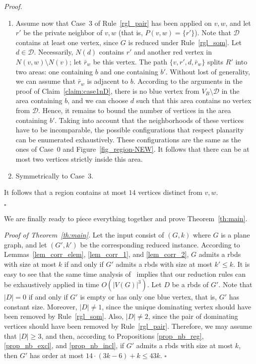\documentclass[a4paper,11pt]{article}
\newcommand{\rrgl}   [1] {Rule~\ref{#1}\xspace}
\newcommand{\drb}    [0] {rbds\xspace}
\newenvironment{proof}{\noindent \textit{Proof. }}{\hfill$\square$\vspace{.2cm}}
\newenvironment{proofof}{\noindent \textit{Proof of Theorem~\ref{th:main}. }}{\hfill$\square$\vspace{.2cm}}
\begin{document}
\begin{proof}
\begin{enumerate}
\item
Assume now that Case~3 of \rrgl{rgl_pair}  has been applied on $v,w$, and let $r'$ be the private neighbor of $v,w$ (that is, $P(v,w) =  \{r'\}$).
Note that $\mathcal{D}$ contains at least one vertex, since $G$ is reduced under \rrgl{rgl_som}. Let $d \in \mathcal{D}$.
Necessarily, $N(d)$ contains $r'$ and another red vertex in $N(v,w) \setminus N(v)$; let $\bar r_w$ be this vertex. The path $\{v,r',d,\bar r_w\}$ splits $R'$ into two areas: one containing $b$ and one containing $b'$. Without lost of generality, we can assume that $\bar r_w$ is adjacent to $b$. According to the arguments in the proof of Claim~\ref{claim:case1nD}, there is no blue vertex from $V_B\setminus \mathcal{D}$ in the area containing $b$, and we can choose $d$ such that this area contains no vertex from $\mathcal{D}$. Hence, it remains to bound the number of vertices in the area containing $b'$. Taking into account that the neighborhoods of these vertices have to be incomparable, the possible configurations that respect planarity can be enumerated exhaustively. These configurations are the same as the ones of Case~0 and Figure~\ref{fig_region-NEW}. It follows that there can be at most two vertices strictly inside this area.

\item
Symmetrically to Case~3.

\end{enumerate}

It follows that a region contains at most $14$ vertices distinct from $v,w$.


\vspace{-.5cm}
\end{proof}

\vspace{.65cm}

We are finally ready to piece everything together and prove Theorem~\ref{th:main}.

\vspace{.35cm}



\begin{proofof}
Let the input consist of $(G,k)$ where $G$ is a plane graph, and let $(G', k')$ be the corresponding reduced instance. According to Lemmas~\ref{lem_corr_elem}, \ref{lem_corr_1}, and \ref{lem_corr_2}, $G$ admits a \drb with size at most $k$ if and only if $G'$ admits a \drb with size at most $k' \leq k$. It is easy to see that the same time analysis of~\cite{AFN04} implies that our reduction rules can be exhaustively applied in time $O(|V(G)|^3)$. Let $D$ be a \drb of $G'$. Note that $|D| = 0 $ if and only if $G'$ is empty or has only one blue vertex, that is, $G'$ has constant size. Moreover, $|D| \neq 1$, since the unique dominating vertex should have been removed by \rrgl{rgl_som}. Also, $|D| \neq 2$, since the pair of dominating vertices should have been removed by \rrgl{rgl_pair}. Therefore, we may assume that $|D| \geq 3$, and then, according to Propositions \ref{prop_nb_reg}, \ref{prop_nb_excl}, and \ref{prop_nb_incl}, if $G'$ admits a \drb with size at most $k$, then $G'$ has order at most $14 \cdot (3k-6) + k \leq 43 k$. \end{proofof}
\end{document}
